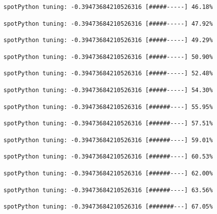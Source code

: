 \documentclass[
  letterpaper,
  DIV=11,
  numbers=noendperiod]{scrreprt}
\begin{document}
\begin{verbatim}
spotPython tuning: -0.39473684210526316 [#####-----] 46.18% 
\end{verbatim}

\begin{verbatim}
spotPython tuning: -0.39473684210526316 [#####-----] 47.92% 
\end{verbatim}

\begin{verbatim}
spotPython tuning: -0.39473684210526316 [#####-----] 49.29% 
\end{verbatim}

\begin{verbatim}
spotPython tuning: -0.39473684210526316 [#####-----] 50.90% 
\end{verbatim}

\begin{verbatim}
spotPython tuning: -0.39473684210526316 [#####-----] 52.48% 
\end{verbatim}

\begin{verbatim}
spotPython tuning: -0.39473684210526316 [#####-----] 54.30% 
\end{verbatim}

\begin{verbatim}
spotPython tuning: -0.39473684210526316 [######----] 55.95% 
\end{verbatim}

\begin{verbatim}
spotPython tuning: -0.39473684210526316 [######----] 57.51% 
\end{verbatim}

\begin{verbatim}
spotPython tuning: -0.39473684210526316 [######----] 59.01% 
\end{verbatim}

\begin{verbatim}
spotPython tuning: -0.39473684210526316 [######----] 60.53% 
\end{verbatim}

\begin{verbatim}
spotPython tuning: -0.39473684210526316 [######----] 62.00% 
\end{verbatim}

\begin{verbatim}
spotPython tuning: -0.39473684210526316 [######----] 63.56% 
\end{verbatim}

\begin{verbatim}
spotPython tuning: -0.39473684210526316 [#######---] 67.05% 
\end{verbatim}
\end{document}
